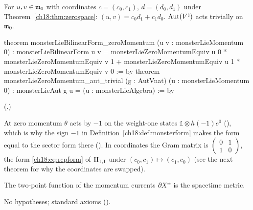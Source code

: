 \begin{theorem}\label{ch18:thm:zeroform}
For $u,v\in\mathfrak{m}_0$ with coordinates $c=(c_0,c_1)$, $d=(d_0,d_1)$ under Theorem~\ref{ch18:thm:zerospace}:
$(u,v)=c_0d_1+c_1d_0$.  $\operatorname{Aut}({V^{\natural}})$ acts trivially on $\mathfrak{m}_0$.
\end{theorem}
\begin{leancode}
theorem monsterLieBilinearForm_zeroMomentum (u v : monsterLieMomentum 0) :
    monsterLieBilinearForm u v =
      monsterLieZeroMomentumEquiv u 0 * monsterLieZeroMomentumEquiv v 1 +
      monsterLieZeroMomentumEquiv u 1 * monsterLieZeroMomentumEquiv v 0 := by
theorem monsterLieZeroMomentum_aut_trivial (g : AutVnat) (u : monsterLieMomentum 0) :
    monsterLieAut g u = (u : monsterLieAlgebra) := by
\end{leancode}
(.)
\begin{dictionary}
At zero momentum $\theta$ acts by $-1$ on the weight-one states $\mathbb 1\otimes h(-1)e^0$
(), which is why the sign $-1$ in Definition~\ref{ch18:def:monsterform} makes the
form equal to the sector form there ().  In coordinates the Gram matrix is
$\left(\begin{smallmatrix}0&1\\1&0\end{smallmatrix}\right)$, the form \eqref{ch18:eq:repform} of $\mathrm{II}_{1,1}$ under
$(c_0,c_1)\mapsto(c_1,c_0)$ (see the next theorem for why the coordinates are swapped).
\end{dictionary}
\begin{physics}The two-point function of the momentum currents $\partial X^\pm$ is the spacetime metric.\end{physics}
\begin{status}No hypotheses; standard axioms ().\end{status}

